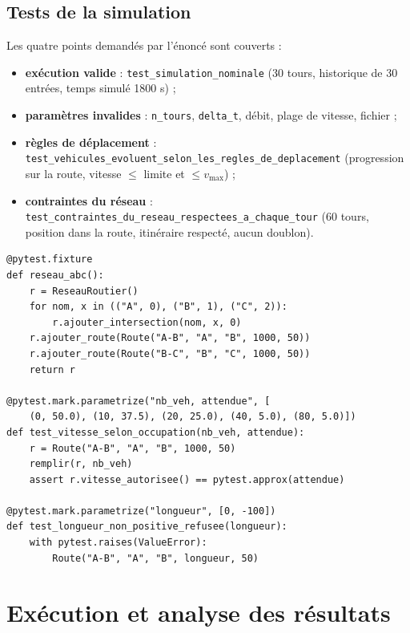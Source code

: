 \documentclass[12pt,a4paper]{report}
\begin{document}
\section{Tests de la simulation}
Les quatre points demandés par l'énoncé sont couverts :
\begin{itemize}
  \item \textbf{exécution valide} : \texttt{test\_\allowbreak{}simulation\_\allowbreak{}nominale} (30 tours, historique de 30 entrées, temps simulé 1800 s) ;
  \item \textbf{paramètres invalides} : \texttt{n\_\allowbreak{}tours}, \texttt{delta\_\allowbreak{}t}, débit, plage de vitesse, fichier ;
  \item \textbf{règles de déplacement} : \texttt{test\_\allowbreak{}vehicules\_\allowbreak{}evoluent\_\allowbreak{}selon\_\allowbreak{}les\_\allowbreak{}regles\_\allowbreak{}de\_\allowbreak{}deplacement}
        (progression sur la route, vitesse $\le$ limite et $\le v_{\max}$) ;
  \item \textbf{contraintes du réseau} : \texttt{test\_\allowbreak{}contraintes\_\allowbreak{}du\_\allowbreak{}reseau\_\allowbreak{}respectees\_\allowbreak{}a\_\allowbreak{}chaque\_\allowbreak{}tour}
        (60 tours, position dans la route, itinéraire respecté, aucun doublon).
\end{itemize}

\begin{lstlisting}[caption={Fixtures et test paramétré (\texttt{tests/})}]
@pytest.fixture
def reseau_abc():
    r = ReseauRoutier()
    for nom, x in (("A", 0), ("B", 1), ("C", 2)):
        r.ajouter_intersection(nom, x, 0)
    r.ajouter_route(Route("A-B", "A", "B", 1000, 50))
    r.ajouter_route(Route("B-C", "B", "C", 1000, 50))
    return r

@pytest.mark.parametrize("nb_veh, attendue", [
    (0, 50.0), (10, 37.5), (20, 25.0), (40, 5.0), (80, 5.0)])
def test_vitesse_selon_occupation(nb_veh, attendue):
    r = Route("A-B", "A", "B", 1000, 50)
    remplir(r, nb_veh)
    assert r.vitesse_autorisee() == pytest.approx(attendue)

@pytest.mark.parametrize("longueur", [0, -100])
def test_longueur_non_positive_refusee(longueur):
    with pytest.raises(ValueError):
        Route("A-B", "A", "B", longueur, 50)
\end{lstlisting}

\chapter{Exécution et analyse des résultats}
\end{document}

